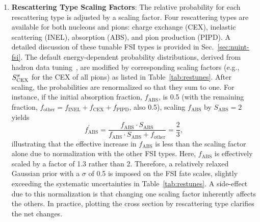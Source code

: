 \begin{enumerate}
        \item \textbf{Rescattering Type Scaling Factors}: 
        The relative probability for each rescattering type is adjusted by a scaling factor. 
        Four rescattering types are available for both nucleons and pions: charge exchange (CEX), inelastic scattering (INEL), absorption (ABS), and pion production (PIPD). 
        A detailed discussion of these tunable FSI types is provided in Sec.~\ref{sec:nuint-fsi}. 
        The default energy-dependent probability distributions, derived from hadron data tuning~\cite{LADS:1999dyv,Navon:1983xj,Carroll:1976hj,Clough:1974qt,BAUHOFF1986429}, are modified by corresponding scaling factors (e.g., $S_\textrm{CEX}^{\pi}$ for the CEX of all pions) as listed in Table~\ref{tab:restunes}. 
        After scaling, the probabilities are renormalized so that they sum to one. 
        For instance, if the initial absorption fraction, $f_\textrm{ABS}$, is 0.5 (with the remaining fraction, $f_\textrm{other}=f_\textrm{INEL}+f_\textrm{CEX}+f_\textrm{PIPD}$, also 0.5), scaling $f_\textrm{ABS}$ by $S_\textrm{ABS}=2$ yields
        \begin{equation}
            f^\prime_\textrm{ABS} = \frac{f_\textrm{ABS} \cdot S_\textrm{ABS}}{f_\textrm{ABS} \cdot S_\textrm{ABS}+f_\textrm{other}} = \frac{2}{3},
        \end{equation}
        illustrating that the effective increase in $f_\textrm{ABS}$ is less than the scaling factor alone due to normalization with the other FSI types.
        Here, $f_\textrm{ABS}$ is effectively scaled by a factor of 1.3 rather than 2. 
        Therefore, a relatively relaxed Gaussian prior with a $\sigma$ of 0.5 is imposed on the FSI fate scales, slightly exceeding the systematic uncertainties in Table~\ref{tab:restunes}.
        A side-effect due to this normalization is that changing one scaling factor inherently affects the others.
        In practice, plotting the cross section by rescattering type clarifies the net changes.
    \end{enumerate}
    
